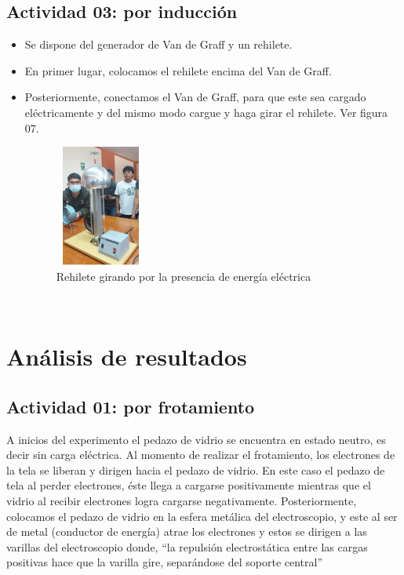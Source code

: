 \subsection{Actividad 03: por inducción}
\begin{itemize}
	\item Se dispone del generador de Van de Graff y un rehilete. 
	\item En primer lugar, colocamos el rehilete encima del Van de Graff.
	\item Posteriormente, conectamos el Van de Graff, para que este sea cargado eléctricamente y del mismo modo cargue y haga girar el rehilete. Ver figura 07.
	\begin{figure} [h]
		\centering\includegraphics[width=3cm, height=4cm]{imagenes/porinduccion.jpg}
		\caption{Rehilete girando por la presencia de energía eléctrica}
	\end{figure}\\
\end{itemize}

\section{Análisis de resultados}
\subsection{Actividad 01: por frotamiento}
A inicios del experimento el pedazo de vidrio se encuentra en estado neutro, es decir sin carga eléctrica. Al momento de realizar el frotamiento, los electrones de la tela se liberan y dirigen hacia el pedazo de vidrio. En este caso el pedazo de tela al perder electrones, éste llega a cargarse positivamente mientras que el vidrio al recibir electrones logra cargarse negativamente.
Posteriormente, colocamos el pedazo de vidrio en la esfera metálica del electroscopio, y este al ser de metal (conductor de energía) atrae los electrones y estos se dirigen a las varillas del electroscopio donde, “la repulsión electrostática entre las cargas positivas hace que la varilla gire, separándose del soporte central” \cite{martinez}

